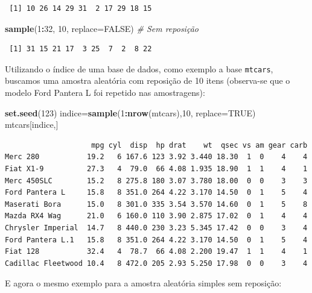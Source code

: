\documentclass[12pt,brazil,oneside]{book}
\newenvironment{Shaded}{\begin{snugshade}}{\end{snugshade}}
\newcommand{\CommentTok}[1]{\textcolor[rgb]{0.56,0.35,0.01}{\textit{#1}}}
\newcommand{\DataTypeTok}[1]{\textcolor[rgb]{0.13,0.29,0.53}{#1}}
\newcommand{\DecValTok}[1]{\textcolor[rgb]{0.00,0.00,0.81}{#1}}
\newcommand{\KeywordTok}[1]{\textcolor[rgb]{0.13,0.29,0.53}{\textbf{#1}}}
\newcommand{\NormalTok}[1]{#1}
\newcommand{\OperatorTok}[1]{\textcolor[rgb]{0.81,0.36,0.00}{\textbf{#1}}}
\newcommand{\OtherTok}[1]{\textcolor[rgb]{0.56,0.35,0.01}{#1}}
\begin{document}
\begin{verbatim}
 [1] 10 26 14 29 31  2 17 29 18 15
\end{verbatim}

\begin{Shaded}
\begin{Highlighting}[]
\KeywordTok{sample}\NormalTok{(}\DecValTok{1}\OperatorTok{:}\DecValTok{32}\NormalTok{, }\DecValTok{10}\NormalTok{, }\DataTypeTok{replace=}\OtherTok{FALSE}\NormalTok{) }\CommentTok{# Sem reposição}
\end{Highlighting}
\end{Shaded}

\begin{verbatim}
 [1] 31 15 21 17  3 25  7  2  8 22
\end{verbatim}

Utilizando o índice de uma base de dados, como exemplo a base \texttt{mtcars}, buscamos uma amostra aleatória com reposição de 10 itens (observa-se que o modelo Ford Pantera L foi repetido nas amostragens):

\begin{Shaded}
\begin{Highlighting}[]
\KeywordTok{set.seed}\NormalTok{(}\DecValTok{123}\NormalTok{)}
\NormalTok{indice=}\KeywordTok{sample}\NormalTok{(}\DecValTok{1}\OperatorTok{:}\KeywordTok{nrow}\NormalTok{(mtcars),}\DecValTok{10}\NormalTok{, }\DataTypeTok{replace=}\OtherTok{TRUE}\NormalTok{)}
\NormalTok{mtcars[indice,]}
\end{Highlighting}
\end{Shaded}

\begin{verbatim}
                    mpg cyl  disp  hp drat    wt  qsec vs am gear carb
Merc 280           19.2   6 167.6 123 3.92 3.440 18.30  1  0    4    4
Fiat X1-9          27.3   4  79.0  66 4.08 1.935 18.90  1  1    4    1
Merc 450SLC        15.2   8 275.8 180 3.07 3.780 18.00  0  0    3    3
Ford Pantera L     15.8   8 351.0 264 4.22 3.170 14.50  0  1    5    4
Maserati Bora      15.0   8 301.0 335 3.54 3.570 14.60  0  1    5    8
Mazda RX4 Wag      21.0   6 160.0 110 3.90 2.875 17.02  0  1    4    4
Chrysler Imperial  14.7   8 440.0 230 3.23 5.345 17.42  0  0    3    4
Ford Pantera L.1   15.8   8 351.0 264 4.22 3.170 14.50  0  1    5    4
Fiat 128           32.4   4  78.7  66 4.08 2.200 19.47  1  1    4    1
Cadillac Fleetwood 10.4   8 472.0 205 2.93 5.250 17.98  0  0    3    4
\end{verbatim}

E agora o mesmo exemplo para a amostra aleatória simples sem reposição:
\end{document}
